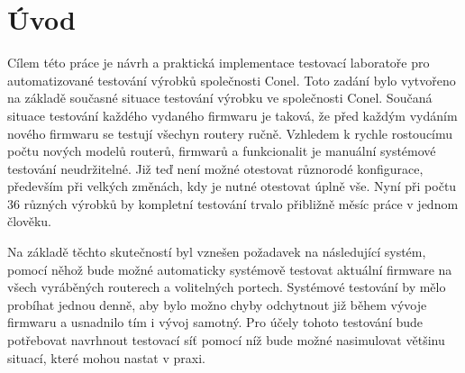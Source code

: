 \chapter{Úvod}
Cílem této práce je návrh a praktická implementace testovací laboratoře pro automatizované testování výrobků společnosti Conel. Toto zadání bylo vytvořeno na základě současné situace testování výrobku ve společnosti Conel. Součaná situace testování každého vydaného firmwaru je taková, že před každým vydáním nového firmwaru se testují všechyn routery ručně. Vzhledem k rychle rostoucímu počtu nových modelů routerů, firmwarů a funkcionalit je manuální systémové testování neudržitelné. Již teď není možné otestovat různorodé konfigurace, především při velkých změnách, kdy je nutné otestovat úplně vše. Nyní při počtu 36 různých výrobků by kompletní testování trvalo přibližně měsíc práce v jednom člověku.

Na základě těchto skutečností byl vznešen požadavek na následující systém, pomocí něhož bude možné automaticky systémově testovat aktuální firmware na všech vyráběných routerech a volitelných portech. Systémové testování by mělo probíhat jednou denně, aby bylo možno chyby odchytnout již během vývoje firmwaru a usnadnilo tím i vývoj samotný. Pro účely tohoto testování bude potřebovat navrhnout testovací síť pomocí níž bude možné nasimulovat většinu situací, které mohou nastat v praxi. 




\endinput

